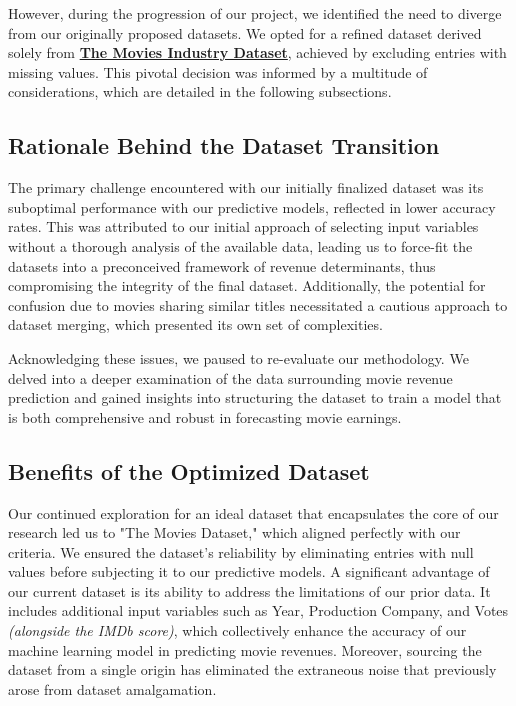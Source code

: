 \documentclass[conference]{IEEEtran}
\begin{document}
        However, during the progression of our project, we identified the need to diverge from our originally proposed datasets. We opted for a refined dataset derived solely from \href{https://www.kaggle.com/datasets/danielgrijalvas/movies}{\textbf{The Movies Industry Dataset}}, achieved by excluding entries with missing values. This pivotal decision was informed by a multitude of considerations, which are detailed in the following subsections.

    \subsection{Rationale Behind the Dataset Transition}
        The primary challenge encountered with our initially finalized dataset was its suboptimal performance with our predictive models, reflected in lower accuracy rates. This was attributed to our initial approach of selecting input variables without a thorough analysis of the available data, leading us to force-fit the datasets into a preconceived framework of revenue determinants, thus compromising the integrity of the final dataset. Additionally, the potential for confusion due to movies sharing similar titles necessitated a cautious approach to dataset merging, which presented its own set of complexities.

        Acknowledging these issues, we paused to re-evaluate our methodology. We delved into a deeper examination of the data surrounding movie revenue prediction and gained insights into structuring the dataset to train a model that is both comprehensive and robust in forecasting movie earnings.

    \subsection{Benefits of the Optimized Dataset}
        Our continued exploration for an ideal dataset that encapsulates the core of our research led us to "The Movies Dataset," which aligned perfectly with our criteria. We ensured the dataset's reliability by eliminating entries with null values before subjecting it to our predictive models. A significant advantage of our current dataset is its ability to address the limitations of our prior data. It includes additional input variables such as Year, Production Company, and Votes \textit{(alongside the IMDb score)}, which collectively enhance the accuracy of our machine learning model in predicting movie revenues. Moreover, sourcing the dataset from a single origin has eliminated the extraneous noise that previously arose from dataset amalgamation.
\end{document}
